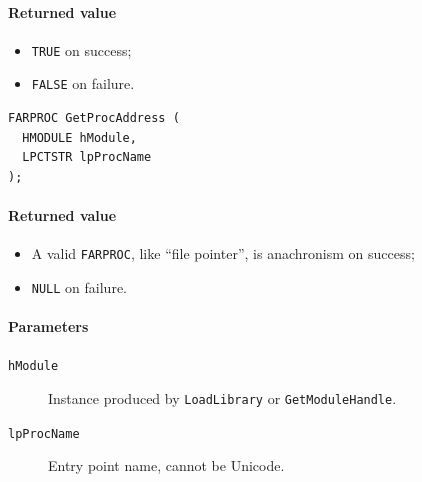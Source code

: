 \paragraph{Returned value}
\begin{itemize}
\item \texttt{TRUE} on success;
\item \texttt{FALSE} on failure.
\end{itemize}

\begin{verbatim}
FARPROC GetProcAddress (
  HMODULE hModule,
  LPCTSTR lpProcName
);
\end{verbatim}

\paragraph{Returned value}
\begin{itemize}
\item A valid \texttt{FARPROC}, like ``file pointer'', is anachronism on success;
\item \texttt{NULL} on failure.
\end{itemize}

\paragraph{Parameters}
\begin{description}
\item [\texttt{hModule}] Instance produced by \texttt{LoadLibrary} or \texttt{GetModuleHandle}.
\item [\texttt{lpProcName}] Entry point name, cannot be Unicode.
\end{description}